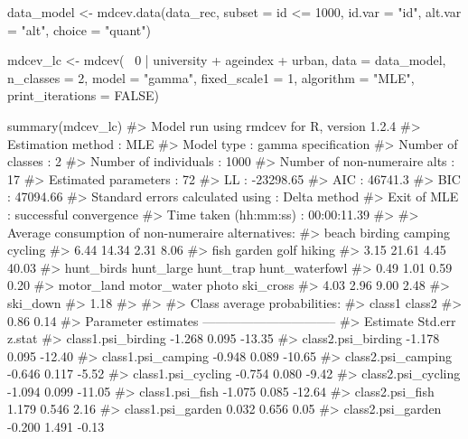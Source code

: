 \begin{example}
data_model <- mdcev.data(data_rec, subset = id <= 1000,
                       id.var = "id",
                       alt.var = "alt",
                       choice = "quant")  

mdcev_lc <- mdcev(~ 0 | university + ageindex + urban,
                  data = data_model,
                  n_classes = 2,
                  model = "gamma",
                  fixed_scale1 = 1,
                  algorithm = "MLE",
                  print_iterations = FALSE)
\end{example}

\begin{example}

summary(mdcev_lc)
#> Model run using rmdcev for R, version 1.2.4 
#> Estimation method                : MLE
#> Model type                       : gamma specification
#> Number of classes                : 2
#> Number of individuals            : 1000
#> Number of non-numeraire alts     : 17
#> Estimated parameters             : 72
#> LL                               : -23298.65
#> AIC                              : 46741.3
#> BIC                              : 47094.66
#> Standard errors calculated using : Delta method
#> Exit of MLE                      : successful convergence
#> Time taken (hh:mm:ss)            : 00:00:11.39
#> 
#> Average consumption of non-numeraire alternatives:
#> 	beach        birding        camping        cycling 
#> 6.44          14.34           2.31           8.06 
#> fish         garden           golf         hiking 
#> 3.15          21.61           4.45          40.03 
#> hunt_birds     hunt_large      hunt_trap hunt_waterfowl 
#> 0.49           1.01           0.59           0.20 
#> motor_land    motor_water      photo      ski_cross 
#> 4.03           2.96           9.00           2.48 
#> ski_down 
#> 1.18 
#> 
#> 
#> Class average probabilities:
#> 	class1 class2 
#> 0.86   0.14 
#> Parameter estimates --------------------------------  
#> 	Estimate Std.err z.stat
#> class1.psi_birding            -1.268   0.095 -13.35
#> class2.psi_birding            -1.178   0.095 -12.40
#> class1.psi_camping            -0.948   0.089 -10.65
#> class2.psi_camping            -0.646   0.117  -5.52
#> class1.psi_cycling            -0.754   0.080  -9.42
#> class2.psi_cycling            -1.094   0.099 -11.05
#> class1.psi_fish               -1.075   0.085 -12.64
#> class2.psi_fish                1.179   0.546   2.16
#> class1.psi_garden              0.032   0.656   0.05
#> class2.psi_garden             -0.200   1.491  -0.13

\end{example}
